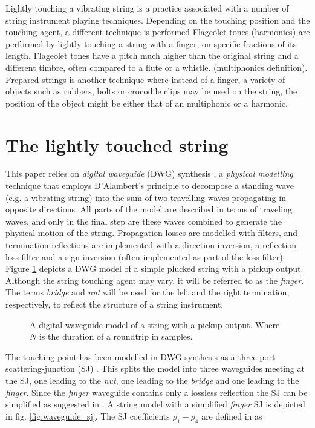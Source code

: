 \documentclass{sigchi}
\begin{document}
Lightly touching a vibrating string is a practice associated with a number of string instrument playing techniques.
Depending on the touching position and the touching agent, a different technique is performed
Flageolet tones (harmonics) are performed by lightly touching a string with a finger, on specific fractions of its length.
Flageolet tones have a pitch much higher than the original string and a different timbre, often compared to a flute or a whistle.
(multiphonics definition).
Prepared strings is another technique where instead of a finger, a variety of objects such as rubbers, bolts or crocodile clips may be used on the string, the position of the object might be either that of an multiphonic or a harmonic.

\section{The lightly touched string}

This paper relies on \textit{digital waveguide} (DWG) synthesis \cite{smith_physical_1992}, a \textit{physical modelling} technique that employs D'Alambert's principle to decompose a standing wave (e.g. a vibrating string) into the sum of two travelling waves propagating in opposite directions.
All parts of the model are described in terms of traveling waves, and only in the final step are these waves combined to generate the physical motion of the string.
Propagation losses are modelled with filters, and termination reflections are implemented with a direction inversion, a reflection loss filter and a sign inversion (often implemented as part of the loss filter).
Figure \ref{fig:pickup} depicts a DWG model of a simple plucked string with a pickup output.
Although the string touching agent may vary, it will be referred to as the \textit{finger}.
The terms \textit{bridge} and \textit{nut} will be used for the left and the right termination, respectively, to reflect the structure of a string instrument.

\begin{figure}[h]
	\centering
	\scalebox{0.75}{}
	\caption{
		A digital waveguide model of a string with a pickup output.
		Where $N$ is the duration of a roundtrip in samples.
	}
	\label{fig:pickup}
\end{figure}

The touching point has been modelled in DWG synthesis as a three-port scattering-junction (SJ) \cite{scavone_digital_1997, valimaki_modeling_1993}.
This splits the model into three waveguides meeting at the SJ, one leading to the \textit{nut}, one leading to the \textit{bridge} and one leading to the \textit{finger}.
Since the \textit{finger} waveguide contains only a lossless reflection the SJ can be simplified as suggested in \cite{pakarinen_physical_2005}.
A string model with a simplified \textit{finger} SJ is depicted in fig. \ref{fig:waveguide_sj}.
The SJ coefficients $\rho_1 - \rho_4$ are defined in \cite{pakarinen_physical_2005} as
\end{document}
